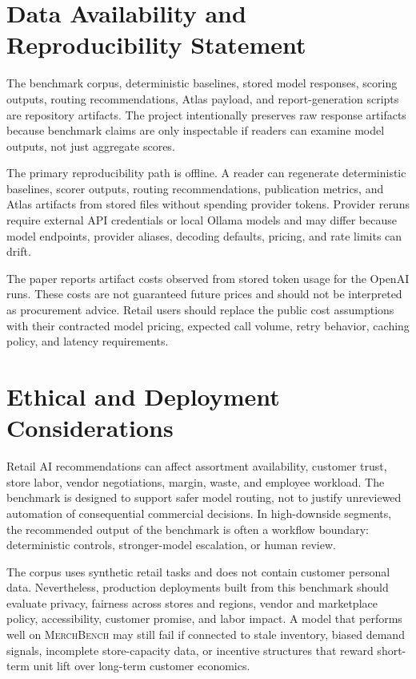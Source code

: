 \documentclass[11pt]{article}
\newcommand{\benchmark}{\textsc{MerchBench}}
\begin{document}
\section{Data Availability and Reproducibility Statement}

The benchmark corpus, deterministic baselines, stored model responses, scoring outputs, routing recommendations, Atlas payload, and report-generation scripts are repository artifacts. The project intentionally preserves raw response artifacts because benchmark claims are only inspectable if readers can examine model outputs, not just aggregate scores.

The primary reproducibility path is offline. A reader can regenerate deterministic baselines, scorer outputs, routing recommendations, publication metrics, and Atlas artifacts from stored files without spending provider tokens. Provider reruns require external API credentials or local Ollama models and may differ because model endpoints, provider aliases, decoding defaults, pricing, and rate limits can drift.

The paper reports artifact costs observed from stored token usage for the OpenAI runs. These costs are not guaranteed future prices and should not be interpreted as procurement advice. Retail users should replace the public cost assumptions with their contracted model pricing, expected call volume, retry behavior, caching policy, and latency requirements.

\section{Ethical and Deployment Considerations}

Retail AI recommendations can affect assortment availability, customer trust, store labor, vendor negotiations, margin, waste, and employee workload. The benchmark is designed to support safer model routing, not to justify unreviewed automation of consequential commercial decisions. In high-downside segments, the recommended output of the benchmark is often a workflow boundary: deterministic controls, stronger-model escalation, or human review.

The corpus uses synthetic retail tasks and does not contain customer personal data. Nevertheless, production deployments built from this benchmark should evaluate privacy, fairness across stores and regions, vendor and marketplace policy, accessibility, customer promise, and labor impact. A model that performs well on \benchmark{} may still fail if connected to stale inventory, biased demand signals, incomplete store-capacity data, or incentive structures that reward short-term unit lift over long-term customer economics.
\end{document}
